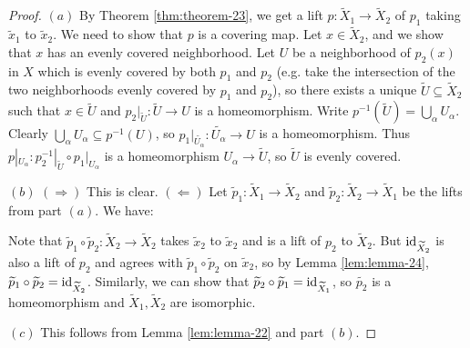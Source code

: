 \begin{proof}
  $(a)$ By Theorem \ref{thm:theorem-23}, we get a lift
  $p : \widetilde{X}_1 \to \widetilde{X}_2$ of
  $p_1$ taking $\widetilde{x}_1$ to $\widetilde{x}_2$.
  We need to show that $p$ is a covering map.
  Let $x \in \widetilde{X}_2$, and we show that $x$ has
  an evenly covered neighborhood. Let
  $U$ be a neighborhood of $p_2(x)$ in $X$ which is
  evenly covered by both $p_1$ and $p_2$ (e.g. take the
  intersection of the two neighborhoods evenly covered by
  $p_1$ and $p_2$), so there exists a unique
  $\widetilde{U} \subseteq \widetilde{X}_2$ such that
  $x \in \widetilde{U}$ and
  $p_2|_{\widetilde{U}} : \widetilde{U} \to U$ is a homeomorphism.
  Write $p^{-1}(\widetilde{U}) = \bigcup_{\alpha} U_\alpha$.
  Clearly $\bigcup_\alpha U_\alpha \subseteq p^{-1}(U)$, so
  $p_1|_{\widetilde{U_\alpha}} : \widetilde{U_\alpha} \to U$ is a homeomorphism.
  Thus $p|_{U_\alpha} : p_2^{-1}|_{\widetilde{U}} \circ p_1|_{U_\alpha}$
  is a homeomorphism $U_\alpha \to \widetilde{U}$, so
  $\widetilde{U}$ is evenly covered.

  $(b)$ $(\Rightarrow)$ This is clear.
  $(\Leftarrow)$ Let $\widetilde{p}_1 : \widetilde{X}_1 \to \widetilde{X}_2$
  and $\widetilde{p}_2 : \widetilde{X}_2 \to \widetilde{X}_1$
  be the lifts from part $(a)$. We have:
  \begin{center}
  \end{center}
  Note that $\widetilde{p}_1 \circ \widetilde{p}_2 : \widetilde{X}_2 \to \widetilde{X}_2$
  takes $\widetilde{x}_2$ to $\widetilde{x}_2$ and is a
  lift of $p_2$ to $\widetilde{X}_2$. But $\operatorname{id}_{\widetilde{X}_2}$
  is also a lift of $p_2$ and agrees with $\widetilde{p}_1 \circ \widetilde{p}_2$ on $\widetilde{x}_2$,
  so by Lemma \ref{lem:lemma-24}, $\widetilde{p}_1 \circ \widetilde{p}_2 = \operatorname{id}_{\widetilde{X}_2}$.
  Similarly, we can show that $\widetilde{p}_2 \circ \widetilde{p}_1 = \operatorname{id}_{\widetilde{X}_1}$,
  so $\widetilde{p_2}$ is a homeomorphism and
  $\widetilde{X}_1, \widetilde{X}_2$ are isomorphic.

  $(c)$ This follows from Lemma \ref{lem:lemma-22}
  and part $(b)$.
\end{proof}
